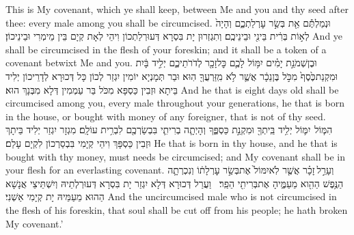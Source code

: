 {This is My covenant, which ye shall keep, between Me and you and thy seed after thee: every male among you shall be circumcised.}{}
{וּנְמַלְתֶּ֕ם אֵ֖ת בְּשַׂ֣ר עׇרְלַתְכֶ֑ם וְהָיָה֙ לְא֣וֹת בְּרִ֔ית בֵּינִ֖י וּבֵינֵיכֶֽם׃}
{וְתִגְזְרוּן יָת בִּסְרָא דְּעוּרְלַתְכוֹן וִיהֵי לְאָת קְיָם בֵּין מֵימְרִי וּבֵינֵיכוֹן׃}
{And ye shall be circumcised in the flesh of your foreskin; and it shall be a token of a covenant betwixt Me and you.}{}
{וּבֶן\maqqaf שְׁמֹנַ֣ת יָמִ֗ים יִמּ֥וֹל לָכֶ֛ם כׇּל\maqqaf זָכָ֖ר לְדֹרֹתֵיכֶ֑ם יְלִ֣יד בָּ֔יִת וּמִקְנַת\maqqaf כֶּ֙סֶף֙ מִכֹּ֣ל בֶּן\maqqaf נֵכָ֔ר אֲשֶׁ֛ר לֹ֥א מִֽזַּרְעֲךָ֖ הֽוּא׃}
{וּבַר תְּמָנְיָא יוֹמִין יִגְזַר לְכוֹן כָּל דְּכוּרָא לְדָרֵיכוֹן יְלִיד בֵּיתָא וּזְבִין כַּסְפָּא מִכֹּל בַּר עַמְמִין דְּלָא מִבְּנָךְ הוּא׃}
{And he that is eight days old shall be circumcised among you, every male throughout your generations, he that is born in the house, or bought with money of any foreigner, that is not of thy seed.}{}
{הִמּ֧וֹל \pasek  יִמּ֛וֹל יְלִ֥יד בֵּֽיתְךָ֖ וּמִקְנַ֣ת כַּסְפֶּ֑ךָ וְהָיְתָ֧ה בְרִיתִ֛י בִּבְשַׂרְכֶ֖ם לִבְרִ֥ית עוֹלָֽם׃}
{מִגְזָר יִגְזַר יְלִיד בֵּיתָךְ וּזְבִין כַּסְפָּךְ וִיהֵי קְיָמִי בִּבְסַרְכוֹן לִקְיָם עָלַם׃}
{He that is born in thy house, and he that is bought with thy money, must needs be circumcised; and My covenant shall be in your flesh for an everlasting covenant.}{}
{וְעָרֵ֣ל \legarmeh  זָכָ֗ר אֲשֶׁ֤ר לֹֽא\maqqaf יִמּוֹל֙ אֶת\maqqaf בְּשַׂ֣ר עׇרְלָת֔וֹ וְנִכְרְתָ֛ה הַנֶּ֥פֶשׁ הַהִ֖וא מֵעַמֶּ֑יהָ אֶת\maqqaf בְּרִיתִ֖י הֵפַֽר׃ \setuma }
{וַעֲרַל דְּכוּרָא דְּלָא יִגְזַר יָת בִּסְרָא דְּעוּרְלְתֵיהּ וְיִשְׁתֵּיצֵי אֲנָשָׁא הַהוּא מֵעַמֵּיהּ יָת קְיָמִי אַשְׁנִי׃}
{And the uncircumcised male who is not circumcised in the flesh of his foreskin, that soul shall be cut off from his people; he hath broken My covenant.’}{}
